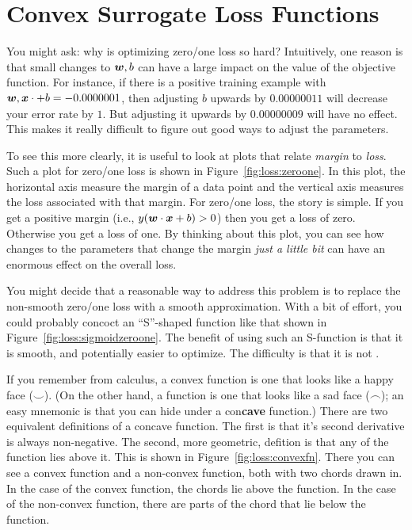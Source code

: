 \section{Convex Surrogate Loss Functions}

You might ask: why is optimizing zero/one loss so hard?  Intuitively,
one reason is that small changes to ${\boldsymbol{w}},b$ can have a large impact on
the value of the objective function.  For instance, if there is a
positive training example with ${\boldsymbol{w}},{\boldsymbol{x}} \cdot +b = -0.0000001$, then
adjusting $b$ upwards by $0.00000011$ will decrease your error rate by
$1$.  But adjusting it upwards by $0.00000009$ will have no effect.
This makes it really difficult to figure out good ways to adjust the
parameters.


To see this more clearly, it is useful to look at plots that relate
\emph{margin} to \emph{loss}.  Such a plot for zero/one loss is shown
in Figure~\ref{fig:loss:zeroone}.  In this plot, the horizontal axis
measure the margin of a data point and the vertical axis measures the
loss associated with that margin.  For zero/one loss, the story is
simple.  If you get a positive margin (i.e., $y({\boldsymbol{w}} \cdot {\boldsymbol{x}}+b)>0$)
then you get a loss of zero.  Otherwise you get a loss of one.  By
thinking about this plot, you can see how changes to the parameters
that change the margin \emph{just a little bit} can have an enormous
effect on the overall loss.


You might decide that a reasonable way to address this problem is to
replace the non-smooth zero/one loss with a smooth approximation.
With a bit of effort, you could probably concoct an ``S''-shaped
function like that shown in Figure~\ref{fig:loss:sigmoidzeroone}.  The
benefit of using such an S-function is that it is smooth, and
potentially easier to optimize.  The difficulty is that it is not
.


If you remember from calculus, a convex function is one that looks
like a happy face ($\smile$).  (On the other hand, a 
function is one that looks like a sad face ($\frown$); an easy
mnemonic is that you can hide under a con{\bf cave} function.)  There
are two equivalent definitions of a concave function.  The first is
that it's second derivative is always non-negative.  The second, more
geometric, defition is that any  of the function lies
above it.  This is shown in Figure~\ref{fig:loss:convexfn}.  There you
can see a convex function and a non-convex function, both with two
chords drawn in.  In the case of the convex function, the chords lie
above the function.  In the case of the non-convex function, there are
parts of the chord that lie below the function.

